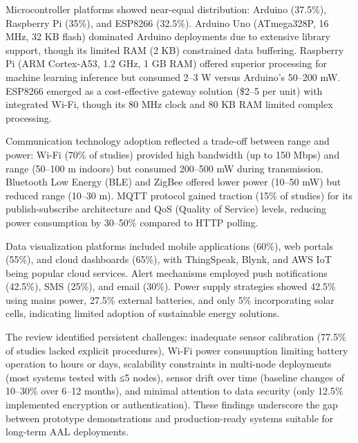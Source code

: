 \documentclass[12pt]{report}
\begin{document}
Microcontroller platforms showed near-equal distribution: Arduino (37.5\%), Raspberry Pi (35\%), and ESP8266 (32.5\%). Arduino Uno (ATmega328P, 16 MHz, 32 KB flash) dominated Arduino deployments due to extensive library support, though its limited RAM (2 KB) constrained data buffering. Raspberry Pi (ARM Cortex-A53, 1.2 GHz, 1 GB RAM) offered superior processing for machine learning inference but consumed 2--3 W versus Arduino's 50--200 mW. ESP8266 emerged as a cost-effective gateway solution (\$2--5 per unit) with integrated Wi-Fi, though its 80 MHz clock and 80 KB RAM limited complex processing.

Communication technology adoption reflected a trade-off between range and power: Wi-Fi (70\% of studies) provided high bandwidth (up to 150 Mbps) and range (50--100 m indoors) but consumed 200--500 mW during transmission. Bluetooth Low Energy (BLE) and ZigBee offered lower power (10--50 mW) but reduced range (10--30 m). MQTT protocol gained traction (15\% of studies) for its publish-subscribe architecture and QoS (Quality of Service) levels, reducing power consumption by 30--50\% compared to HTTP polling.

Data visualization platforms included mobile applications (60\%), web portals (55\%), and cloud dashboards (65\%), with ThingSpeak, Blynk, and AWS IoT being popular cloud services. Alert mechanisms employed push notifications (42.5\%), SMS (25\%), and email (30\%). Power supply strategies showed 42.5\% using mains power, 27.5\% external batteries, and only 5\% incorporating solar cells, indicating limited adoption of sustainable energy solutions.

The review identified persistent challenges: inadequate sensor calibration (77.5\% of studies lacked explicit procedures), Wi-Fi power consumption limiting battery operation to hours or days, scalability constraints in multi-node deployments (most systems tested with ≤5 nodes), sensor drift over time (baseline changes of 10--30\% over 6--12 months), and minimal attention to data security (only 12.5\% implemented encryption or authentication). These findings underscore the gap between prototype demonstrations and production-ready systems suitable for long-term AAL deployments.
\end{document}
